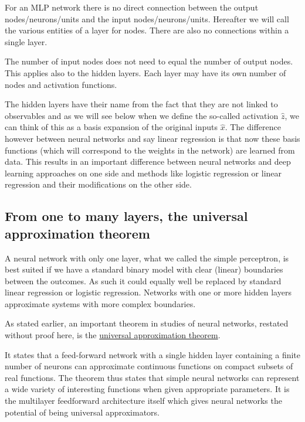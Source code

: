 \documentclass[%
oneside,                 %
final,                   %
10pt]{article}
\begin{document}
For an MLP network there is no direct connection between the output nodes/neurons/units and  the input nodes/neurons/units.
Hereafter we will call the various entities of a layer for nodes.
There are also no connections within a single layer.

The number of input nodes does not need to equal the number of output
nodes. This applies also to the hidden layers. Each layer may have its
own number of nodes and activation functions.

The hidden layers have their name from the fact that they are not
linked to observables and as we will see below when we define the
so-called activation $\hat{z}$, we can think of this as a basis
expansion of the original inputs $\hat{x}$. The difference however
between neural networks and say linear regression is that now these
basis functions (which will correspond to the weights in the network)
are learned from data. This results in  an important difference between
neural networks and deep learning approaches on one side and methods
like logistic regression or linear regression and their modifications on the other side.


\subsection{From one to many layers, the universal approximation theorem}


A neural network with only one layer, what we called the simple
perceptron, is best suited if we have a standard binary model with
clear (linear) boundaries between the outcomes. As such it could
equally well be replaced by standard linear regression or logistic
regression. Networks with one or more hidden layers approximate
systems with more complex boundaries.

As stated earlier, 
an important theorem in studies of neural networks, restated without
proof here, is the \href{{http://citeseerx.ist.psu.edu/viewdoc/download?doi=10.1.1.441.7873&rep=rep1&type=pdf}}{universal approximation
theorem}.

It states that a feed-forward network with a single hidden layer
containing a finite number of neurons can approximate continuous
functions on compact subsets of real functions. The theorem thus
states that simple neural networks can represent a wide variety of
interesting functions when given appropriate parameters. It is the
multilayer feedforward architecture itself which gives neural networks
the potential of being universal approximators.
\end{document}
